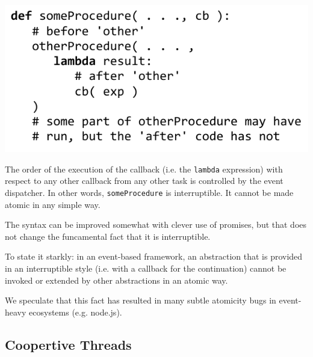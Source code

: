 \documentclass[9pt,preprint]{sigplanconf}
\begin{document}
\noindent
\includegraphics[scale=0.7]{trivial_call_event}

The order of the execution of the callback (i.e. the \texttt{lambda} expression) with  respect to any other callback from any other task is controlled by the event dispatcher.
In other words, \texttt{someProcedure} is interruptible.
It cannot be made atomic in any simple way.

The syntax can be improved somewhat with clever use of promises, but that does not change the funcamental fact that it is interruptible.

To state it starkly: in an event-based framework, an abstraction that is provided in an interruptible style (i.e. with a callback for the continuation) cannot be invoked or extended by other abstractions in an atomic way.

We speculate that this fact has resulted in many subtle atomicity bugs in event-heavy ecosystems (e.g. node.js).

\subsection{Coopertive Threads}



\end{document}

